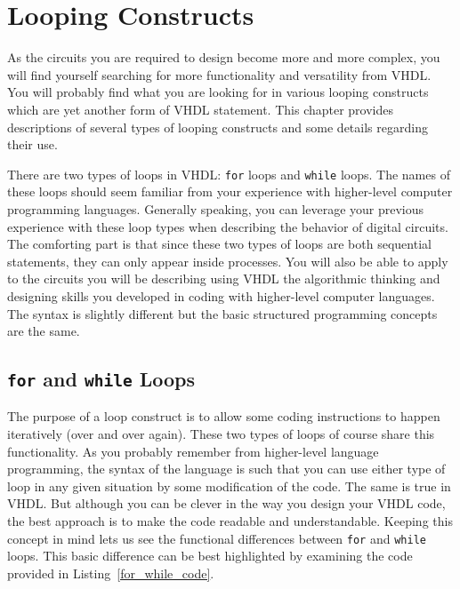 %
%
\chapter{Looping Constructs}
As the circuits you are required to design become more and more complex, you will find yourself searching for more functionality and versatility from VHDL. You will probably find what you are looking for in various looping constructs which are yet another form of VHDL statement. This chapter provides descriptions of several types of looping constructs and some details regarding their use.

There are two types of loops in VHDL: \texttt{for} loops and \texttt{while} loops. The names of these loops should seem familiar from your experience with higher-level computer programming languages. Generally speaking, you can leverage your previous experience with these loop types when describing the behavior of digital circuits. The comforting part is that since these two types of loops are both sequential statements, they can only appear inside processes. You will also be able to apply to the circuits you will be describing using VHDL the algorithmic thinking and designing skills you developed in coding with higher-level computer languages. The syntax is slightly different but the basic structured programming concepts are the same.

\section{\texttt{for} and \texttt{while} Loops}
The purpose of a loop construct is to allow some coding instructions to happen iteratively (over and over again). These two types of loops of course share this functionality. As you probably remember from higher-level language programming, the syntax of the language is such that you can use either type of loop in any given situation by some modification of the code. The same is true in VHDL. But although you can be clever in the way you design your VHDL code, the best approach is to make the code readable and understandable. Keeping this concept in mind lets us see the functional differences between \texttt{for} and \texttt{while} loops. This basic difference can be best highlighted by examining the code provided in Listing~\ref{for_while_code}.

